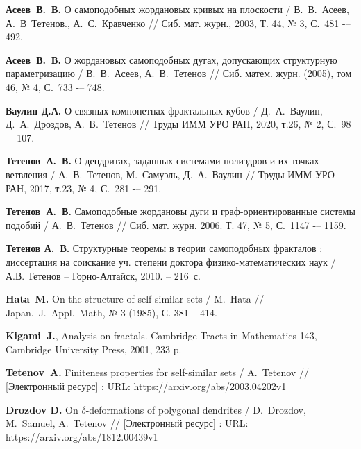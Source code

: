 %
%




\begin{thebibliography}{99}
{\bf Асеев~В.~В.} 
О самоподобных жордановых кривых на плоскости / 
В.~В.~Асеев, А.~В~Тетенов., А.~С.~Кравченко //
Сиб. мат. журн., 2003, Т. 44, № 3, С.~481 -– 492.

{\bf Асеев~В.~В.} 
О жордановых самоподобных дугах, допускающих структурную параметризацию /
В.~В.~Асеев, А.~В.~Тетенов //
Сиб. матем. журн. (2005), том 46, № 4, С.~733 -– 748.

{\bf Ваулин Д.А.}
О связных компонетнах фрактальных кубов / 
Д.~А.~Ваулин, Д.~А.~Дроздов, А.~В.~Тетенов //
Труды ИММ УРО РАН, 2020, т.26, № 2, С.~98 -– 107.

{\bf Тетенов~А.~В.}  
О дендритах, заданных системами полиэдров и их точках ветвления /
А.~В.~Тетенов, М.~Самуэль, Д.~А.~Ваулин // 
Труды ИММ УРО РАН, 2017, т.23, № 4, С.~281 -– 291.

{\bf Тетенов~А.~В.}
Самоподобные жордановы дуги и граф-ориентированные системы подобий /
А.~В.~Тетенов //
Сиб. мат. журн. 2006. Т. 47, № 5, С.~1147 -– 1159.

{\bf Тетенов А.~В.} 
Структурные теоремы в теории самоподобных фракталов : диссертация на соискание уч. степени доктора физико-математических наук / А.В. Тетенов -- Горно-Алтайск, 2010. -- 216~с. 

{\bf Hata~M.}  
On the structure of self-similar sets /
M.~Hata //
Japan.~J.~Appl.~Math, № 3 (1985), С. 381 -- 414.

{\bf Kigami~J.}, 
Analysis on fractals. Cambridge Tracts in Mathematics 143, 
Cambridge University Press, 2001, 233 p.

{\bf Tetenov~A.}
Finiteness properties for self-similar sets /
A.~Tetenov //
[Электронный ресурс] : URL: https://arxiv.org/abs/2003.04202v1

{\bf Drozdov D.}
On $\delta$-deformations of polygonal dendrites /
D.~Drozdov, M.~Samuel, A.~Tetenov //
[Электронный ресурс] : URL: https://arxiv.org/abs/1812.00439v1


\end{thebibliography}
